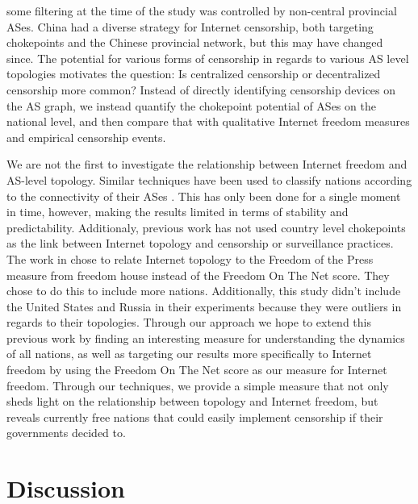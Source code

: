 \documentclass[10pt, conference, letterpaper]{IEEEtran}
\begin{document}
some filtering at the time of the study was controlled by non-central provincial
ASes. China had a
diverse strategy for Internet censorship, both targeting chokepoints and the
Chinese provincial network, but this may have changed since. The potential for various forms of censorship in
regards to various AS level topologies motivates the question: Is centralized
censorship or decentralized censorship more common? Instead of directly
identifying censorship devices on the AS graph, we instead quantify the
chokepoint potential of ASes on the national level, and then compare that with
qualitative Internet freedom measures and empirical censorship events.
\par
We are not the first to investigate the relationship between Internet freedom and
AS-level topology. Similar techniques have been used to classify nations according
to the connectivity of their ASes \cite{politicsrouting}. This has only been done for a
single moment in time, however, making the results limited in terms of stability and predictability.
Additionaly, previous work has not used country level chokepoints as the link between Internet topology
and censorship or surveillance practices. The work in \cite{politicsrouting} chose to relate Internet topology
to the Freedom of the Press measure from freedom house instead of the Freedom On The Net score. They chose to do this
to include more nations. Additionally, this study didn't include the United States and Russia in their experiments because they were
outliers in regards to their topologies. Through our approach we hope to extend this previous work by finding an interesting measure for
understanding the dynamics of all nations, as well as targeting our results more specifically to Internet freedom by using the Freedom On
The Net score as our measure for Internet freedom. Through our techniques, we provide a simple measure that not only 
sheds light on the relationship between topology and Internet freedom, but reveals currently free
nations that could easily implement censorship if their governments decided to.


\section{Discussion}
\end{document}
